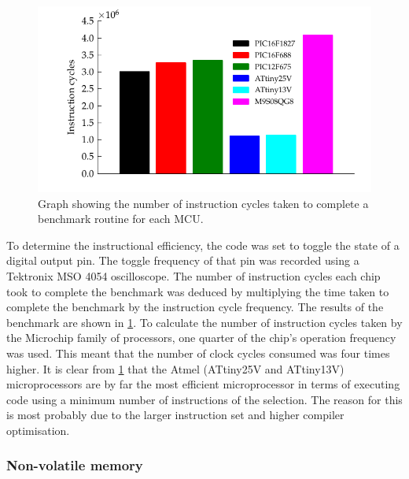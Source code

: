       \begin{figure}
          \begin{centering}
              \includegraphics{content/pt1/03-EnergyRequirements/graphics/Graph_All_Clock_Benchmark}
          \end{centering}
          \protect\caption{\label{fig:GraphBar_All_Benchmark}Graph showing the number of instruction cycles taken to complete a benchmark routine for each MCU.}
      \end{figure}

      To determine the instructional efficiency, the code was set to toggle the state of a digital output pin.
      The toggle frequency of that pin was recorded using a Tektronix MSO 4054 oscilloscope.
      The number of instruction cycles each chip took to complete the benchmark was deduced by multiplying the time taken to complete the benchmark by the instruction cycle frequency.
      The results of the benchmark are shown in \cref{fig:GraphBar_All_Benchmark}.
      To calculate the number of instruction cycles taken by the Microchip family of processors, one quarter of the chip's operation frequency was used.
      This meant that the number of clock cycles consumed was four times higher.
      It is clear from \cref{fig:GraphBar_All_Benchmark} that the Atmel (ATtiny25V and ATtiny13V) microprocessors are by far the most efficient microprocessor in terms of executing code using a minimum number of instructions of the selection.
      The reason for this is most probably due to the larger instruction set and higher compiler optimisation.



    \subsubsection{Non-volatile memory}

